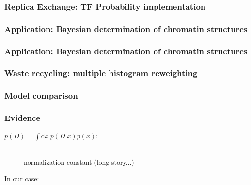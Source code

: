 \documentclass[t,aspectratio=169]{beamer}
\renewcommand{\d}{\mathrm{d}}
\begin{document}
\begin{frame}
  \frametitle{Replica Exchange: TF Probability implementation}
\end{frame}

\begin{frame}
  \frametitle{Application: Bayesian determination of chromatin structures}
\end{frame}

\begin{frame}
  \frametitle{Application: Bayesian determination of chromatin structures}
\end{frame}

\begin{frame}
  \frametitle{Waste recycling: multiple histogram reweighting}
\end{frame}

\begin{frame}
  \frametitle{Model comparison}
\end{frame}


\begin{frame}[label=evidence_frame]
  \frametitle{Evidence}
  \begin{description}
  \item[$p(D) = \int \d x\ p(D|x)p(x)$:]\hfill \\
    normalization constant (long story...)
  \end{description}
  In our case:
\end{frame}
\end{document}
